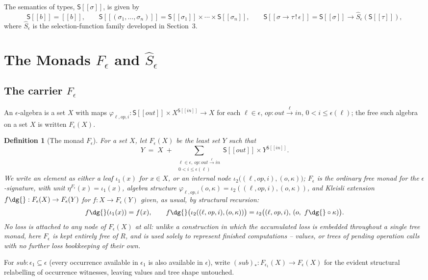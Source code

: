 \documentclass[11pt]{article}
\theoremstyle{plain}
\newtheorem{definition}[theorem]{Definition}
\newcommand{\Ssem}[1]{\mathsf{S}[\![#1]\!]}
\newcommand{\Fm}[1]{F_{#1}}
\newcommand{\Sm}[1]{\widehat{S}_{#1}}
\newcommand{\eps}{\epsilon}
\newcommand{\op}{\mathit{op}}
\begin{document}
The semantics of types, $\Ssem\sigma$, is given by
\[
  \Ssem{b} = [\![b]\!], \qquad
  \Ssem{(\sigma_1,\dots,\sigma_n)} = \Ssem{\sigma_1}\times\cdots\times\Ssem{\sigma_n}, \qquad
  \Ssem{\sigma\to\tau\,!\,\eps} = \Ssem{\sigma}\to \Sm\eps(\Ssem{\tau}),
\]
where $\Sm\eps$ is the selection-function family developed in Section~3.

\section{The Monads $\Fm\eps$ and $\Sm\eps$}

\subsection{The carrier $\Fm\eps$}

An $\eps$-algebra is a set $X$ with maps
$\varphi_{\ell,\op,i} : \Ssem{\mathit{out}}\times X^{\Ssem{\mathit{in}}}\to X$ for each
$\ell\in\eps$, $\op:\mathit{out}\xrightarrow{\ell}\mathit{in}$, $0<i\le\eps(\ell)$; the free
such algebra on a set $X$ is written $\Fm\eps(X)$.

\begin{definition}[The monad $\Fm\eps$]
For a set $X$, let $\Fm\eps(X)$ be the least set $Y$ such that
\[
  Y \;=\; X \;+\; \sum_{\substack{\ell\in\eps,\ \op:\mathit{out}\xrightarrow{\ell}\mathit{in}\\ 0<i\le\eps(\ell)}}
        \Ssem{\mathit{out}} \times Y^{\Ssem{\mathit{in}}}.
\]
We write an element as either a leaf $\iota_1(x)$ for $x\in X$, or an internal node
$\iota_2\big((\ell,\op,i),(o,\kappa)\big)$; $\Fm\eps$ is the ordinary free monad for the
$\eps$-signature, with unit $\eta^{\Fm\eps}(x)=\iota_1(x)$, algebra structure
$\varphi_{\ell,\op,i}(o,\kappa)=\iota_2((\ell,\op,i),(o,\kappa))$, and Kleisli extension
$f\dg{}:\Fm\eps(X)\to\Fm\eps(Y)$ for $f:X\to\Fm\eps(Y)$ given, as usual, by structural
recursion:
\[
  f\dg{}(\iota_1(x)) = f(x), \qquad
  f\dg{}\big(\iota_2((\ell,\op,i),(o,\kappa))\big) = \iota_2\big((\ell,\op,i),\,(o,\ f\dg{}\circ\kappa)\big).
\]
No loss is attached to any node of $\Fm\eps(X)$ at all: unlike a construction in which the
accumulated loss is embedded throughout a single tree monad, here $\Fm\eps$ is kept
entirely free of $R$, and is used solely to represent \emph{finished} computations --
values, or trees of pending operation calls with no further loss bookkeeping of their own.
\end{definition}

For $\mathit{sub}:\eps_1\subseteq\eps$ (every occurrence available in $\eps_1$ is also
available in $\eps$), write $(\mathit{sub})_*:\Fm{\eps_1}(X)\to\Fm\eps(X)$ for the evident
structural relabelling of occurrence witnesses, leaving values and tree shape untouched.
\end{document}
